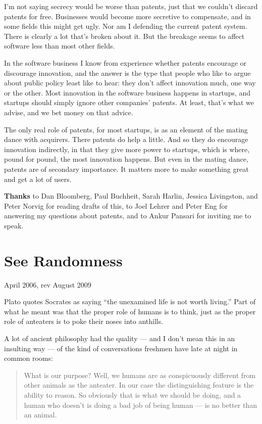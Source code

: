 \documentclass[12pt]{book}
\begin{document}
I'm not saying secrecy would be worse than patents, just that we
couldn't discard patents for free. Businesses would become more
secretive to compensate, and in some fields this might get ugly. Nor am
I defending the current patent system. There is clearly a lot that's
broken about it. But the breakage seems to affect software less than
most other fields.

In the software business I know from experience whether patents
encourage or discourage innovation, and the answer is the type that
people who like to argue about public policy least like to hear: they
don't affect innovation much, one way or the other. Most innovation in
the software business happens in startups, and startups should simply
ignore other companies' patents. At least, that's what we advise, and we
bet money on that advice.

The only real role of patents, for most startups, is as an element of
the mating dance with acquirers. There patents do help a little. And so
they do encourage innovation indirectly, in that they give more power to
startups, which is where, pound for pound, the most innovation happens.
But even in the mating dance, patents are of secondary importance. It
matters more to make something great and get a lot of users.


\textbf{Thanks} to Dan Bloomberg, Paul Buchheit, Sarah Harlin, Jessica
Livingston, and Peter Norvig for reading drafts of this, to Joel Lehrer
and Peter Eng for answering my questions about patents, and to Ankur
Pansari for inviting me to speak.
\chapter{See Randomness}

April 2006, rev August 2009

Plato quotes Socrates as saying ``the unexamined life is not worth
living.'' Part of what he meant was that the proper role of humans is to
think, just as the proper role of anteaters is to poke their noses into
anthills.

A lot of ancient philosophy had the quality --- and I don't mean this in
an insulting way --- of the kind of conversations freshmen have late at
night in common rooms:

\begin{quote}
What is our purpose? Well, we humans are as conspicuously different from
other animals as the anteater. In our case the distinguishing feature is
the ability to reason. So obviously that is what we should be doing, and
a human who doesn't is doing a bad job of being human --- is no better
than an animal.
\end{quote}
\end{document}
